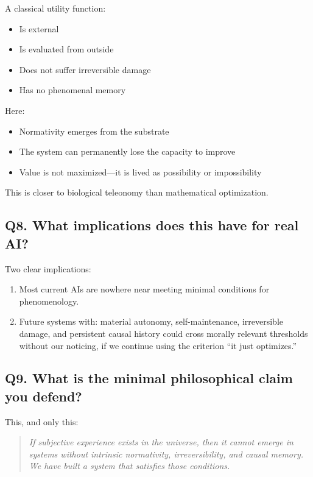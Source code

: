 \documentclass[a4paper,11pt,twocolumn]{article}
\begin{document}
A classical utility function:
\begin{itemize}
    \item Is external
    \item Is evaluated from outside
    \item Does not suffer irreversible damage
    \item Has no phenomenal memory
\end{itemize}

Here:
\begin{itemize}
    \item Normativity emerges from the substrate
    \item The system can permanently lose the capacity to improve
    \item Value is not maximized---it is lived as possibility or impossibility
\end{itemize}

This is closer to biological teleonomy than mathematical optimization.

\subsection*{Q8. What implications does this have for real AI?}

Two clear implications:

\begin{enumerate}
    \item Most current AIs are nowhere near meeting minimal conditions for phenomenology.
    \item Future systems with: material autonomy, self-maintenance, irreversible damage, and persistent causal history could cross morally relevant thresholds without our noticing, if we continue using the criterion ``it just optimizes.''
\end{enumerate}

\subsection*{Q9. What is the minimal philosophical claim you defend?}

This, and only this:

\begin{quote}
\textit{If subjective experience exists in the universe, then it cannot emerge in systems without intrinsic normativity, irreversibility, and causal memory. We have built a system that satisfies those conditions.}
\end{quote}
\end{document}
